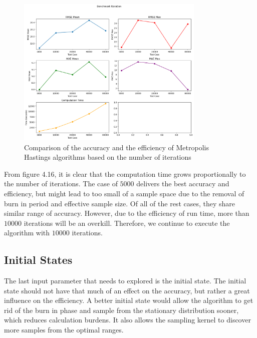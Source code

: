 \begin{figure}
    \centering
    \includegraphics[width=0.8\textwidth]{figures/basic_mh/benchmark/iteration.png}
    \captionsetup{width=.8\textwidth}
    \caption{Comparison of the accuracy and the efficiency of Metropolis Hastings algorithms based on the number of iterations}
    \label{fig:enter-label}
\end{figure}

From figure 4.16, it is clear that the computation time grows proportionally to the number of iterations. The case of $5000$ delivers the best accuracy and efficiency, but might lead to too small of a sample space due to the removal of burn in period and effective sample size. Of all of the rest cases, they share similar range of accuracy. However, due to the efficiency of run time, more than $10000$ iterations will be an overkill. Therefore, we continue to execute the algorithm with $10000$ iterations. 

\subsection{Initial States}
The last input parameter that needs to explored is the initial state. The initial state should not have that much of an effect on the accuracy, but rather a great influence on the efficiency.\cite{mcmc_practice} A better initial state would allow the algorithm to get rid of the burn in phase and sample from the stationary distribution sooner, which reduces calculation burdens. It also allows the sampling kernel to discover more samples from the optimal ranges.

